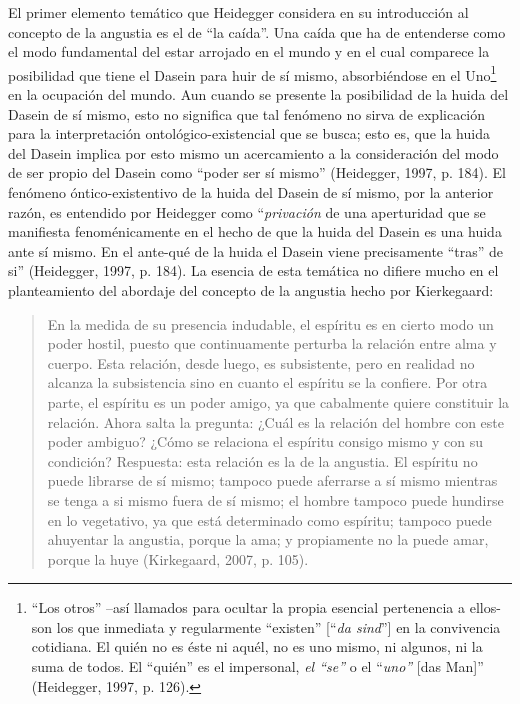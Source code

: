 \documentclass[]{article}
\begin{document}
El primer elemento temático que Heidegger considera en su introducción al concepto de la angustia es el de ``la caída''. Una caída que ha de entenderse como el modo fundamental del estar arrojado en el mundo y en el cual comparece la posibilidad que tiene el Dasein para huir de sí mismo, absorbiéndose en el Uno\footnote{``Los otros'' --así llamados para ocultar la propia esencial pertenencia a ellos- son los que inmediata y regularmente ``existen'' {[}``\emph{da sind}''{]} en la convivencia cotidiana. El quién no es éste ni aquél, no es uno mismo, ni algunos, ni la suma de todos. El ``quién'' es el impersonal, \emph{el ``se''} o el ``\emph{uno''} {[}das Man{]}'' (Heidegger, 1997, p. 126).} en la ocupación del mundo. Aun cuando se presente la posibilidad de la huida del Dasein de sí mismo, esto no significa que tal fenómeno no sirva de explicación para la interpretación ontológico-existencial que se busca; esto es, que la huida del Dasein implica por esto mismo un acercamiento a la consideración del modo de ser propio del Dasein como ``poder ser sí mismo'' (Heidegger, 1997, p. 184). El fenómeno óntico-existentivo de la huida del Dasein de sí mismo, por la anterior razón, es entendido por Heidegger como ``\emph{privación} de una aperturidad que se manifiesta fenoménicamente en el hecho de que la huida del Dasein es una huida ante sí mismo. En el ante-qué de la huida el Dasein viene precisamente ``tras'' de si'' (Heidegger, 1997, p. 184). La esencia de esta temática no difiere mucho en el planteamiento del abordaje del concepto de la angustia hecho por Kierkegaard:

\begin{quote}
En la medida de su presencia indudable, el espíritu es en cierto modo un poder hostil, puesto que continuamente perturba la relación entre alma y cuerpo. Esta relación, desde luego, es subsistente, pero en realidad no alcanza la subsistencia sino en cuanto el espíritu se la confiere. Por otra parte, el espíritu es un poder amigo, ya que cabalmente quiere constituir la relación. Ahora salta la pregunta: ¿Cuál es la relación del hombre con este poder ambiguo? ¿Cómo se relaciona el espíritu consigo mismo y con su condición? Respuesta: esta relación es la de la angustia. El espíritu no puede librarse de sí mismo; tampoco puede aferrarse a sí mismo mientras se tenga a si mismo fuera de sí mismo; el hombre tampoco puede hundirse en lo vegetativo, ya que está determinado como espíritu; tampoco puede ahuyentar la angustia, porque la ama; y propiamente no la puede amar, porque la huye (Kirkegaard, 2007, p. 105).
\end{quote}
\end{document}
